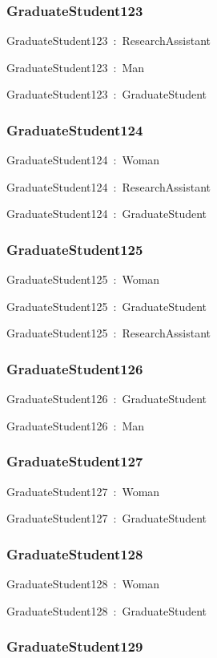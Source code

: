 \documentclass{article}
\begin{document}
\subsubsection*{GraduateStudent123}

GraduateStudent123~:~ResearchAssistant

GraduateStudent123~:~Man

GraduateStudent123~:~GraduateStudent

\subsubsection*{GraduateStudent124}

GraduateStudent124~:~Woman

GraduateStudent124~:~ResearchAssistant

GraduateStudent124~:~GraduateStudent

\subsubsection*{GraduateStudent125}

GraduateStudent125~:~Woman

GraduateStudent125~:~GraduateStudent

GraduateStudent125~:~ResearchAssistant

\subsubsection*{GraduateStudent126}

GraduateStudent126~:~GraduateStudent

GraduateStudent126~:~Man

\subsubsection*{GraduateStudent127}

GraduateStudent127~:~Woman

GraduateStudent127~:~GraduateStudent

\subsubsection*{GraduateStudent128}

GraduateStudent128~:~Woman

GraduateStudent128~:~GraduateStudent

\subsubsection*{GraduateStudent129}
\end{document}
